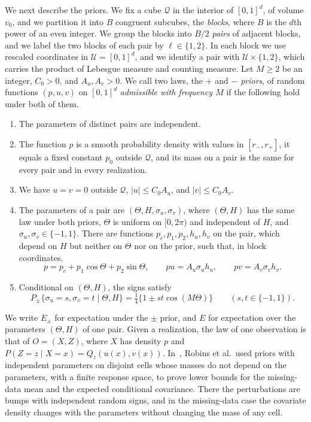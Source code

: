 We next describe the priors. We fix a cube $\mathcal Q$ in the interior
of $[0,1]^d$, of volume $v_0$, and we partition it into $B$ congruent
subcubes, the \emph{blocks}, where $B$ is the $d$th power of an even
integer. We group the blocks into $B/2$ \emph{pairs} of adjacent
blocks, and we label the two blocks of each pair by $\ell\in\{1,2\}$.
In each block we use rescaled coordinates in $\mathcal U=[0,1]^d$, and
we identify a pair with $\mathcal U\times\{1,2\}$, which carries the
product of Lebesgue measure and counting measure. Let $M\ge2$ be an
integer, $C_0>0$, and $A_u,A_v>0$. We call two laws, the $+$ and $-$
\emph{priors}, of random functions $(p,u,v)$ on $[0,1]^d$
\emph{admissible with frequency $M$} if the following hold under both
of them.
\begin{enumerate}[label=(A\arabic*)]
\item The parameters of distinct pairs are independent.
\item The function $p$ is a smooth probability density with values in
$[r_-,r_+]$, it equals a fixed constant $p_0$ outside $\mathcal Q$, and
its mass on a pair is the same for every pair and in every realization.
\item We have $u=v=0$ outside $\mathcal Q$, $|u|\le C_0A_u$, and
$|v|\le C_0A_v$.
\item The parameters of a pair are $(\Theta,H,\sigma_u,\sigma_v)$,
where $(\Theta,H)$ has the same law under both priors, $\Theta$ is
uniform on $[0,2\pi)$ and independent of $H$, and
$\sigma_u,\sigma_v\in\{-1,1\}$. There are functions
$p_c,p_1,p_2,h_u,h_v$ on the pair, which depend on $H$ but
neither on $\Theta$ nor on the prior, such that, in block coordinates,
\[
 p=p_c+p_1\cos\Theta+p_2\sin\Theta,\qquad
 pu=A_u\sigma_uh_u,\qquad pv=A_v\sigma_vh_v.
\]
\item Conditional on $(\Theta,H)$, the signs satisfy
\[
 P_\pm\{\sigma_u=s,\sigma_v=t\mid\Theta,H\}
 =\tfrac14\{1\pm st\cos(M\Theta)\}\qquad(s,t\in\{-1,1\}).
\]
\end{enumerate}
We write $E_\pm$ for expectation under the $\pm$ prior, and $E$ for
expectation over the parameters $(\Theta,H)$ of one pair. Given a
realization, the law of one observation is that of $O=(X,Z)$, where $X$
has density $p$ and $P(Z=z\mid X=x)=Q_z(u(x),v(x))$.
In~\cite[Theorem~2.1 and Sections~3--4]{robins2009}, Robins et al.\ used
priors with independent parameters on disjoint cells whose masses do not
depend on the parameters, with a finite response space, to prove lower
bounds for the missing-data mean and the expected conditional
covariance. There the perturbations are bumps with independent random
signs, and in the missing-data case the covariate density changes with the parameters
without changing the mass of any cell.

